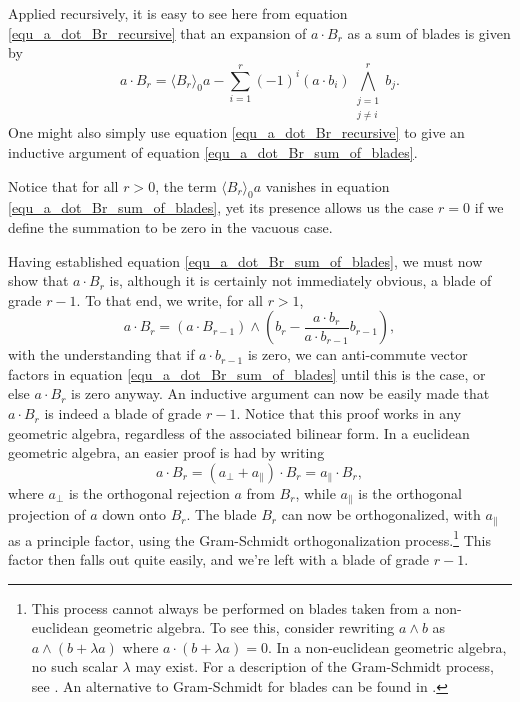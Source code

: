 \documentclass{birkjour}
\theoremstyle{definition}
\theoremstyle{remark}
\numberwithin{equation}{section}
\begin{document}
Applied recursively, it is easy to see here from equation \eqref{equ_a_dot_Br_recursive} that an expansion of
$a\cdot B_r$ as a sum of blades is given by
\begin{equation}\label{equ_a_dot_Br_sum_of_blades}
a\cdot B_r = \langle B_r\rangle_0a - \sum_{i=1}^r(-1)^i(a\cdot b_i)\bigwedge_{\substack{j=1\\j\neq i}}^r b_j.
\end{equation}
One might also simply use equation \eqref{equ_a_dot_Br_recursive} to give an inductive
argument of equation \eqref{equ_a_dot_Br_sum_of_blades}.

Notice that for all $r>0$, the term $\langle B_r\rangle_0a$ vanishes in equation \eqref{equ_a_dot_Br_sum_of_blades},
yet its presence allows us the case $r=0$ if we define the summation to be zero in the vacuous case.

Having established equation \eqref{equ_a_dot_Br_sum_of_blades}, we must now show that $a\cdot B_r$ is,
although it is certainly not immediately obvious, a blade of grade $r-1$.  To that end, we write, for all $r>1$,
\begin{equation*}
a\cdot B_r = (a\cdot B_{r-1})\wedge\left(b_r - \frac{a\cdot b_r}{a\cdot b_{r-1}}b_{r-1}\right),
\end{equation*}
with the understanding that if $a\cdot b_{r-1}$ is zero, we can anti-commute vector factors in equation \eqref{equ_a_dot_Br_sum_of_blades}
until this is the case, or else $a\cdot B_r$ is zero anyway.
An inductive argument can now be easily made that $a\cdot B_r$ is indeed a blade of grade $r-1$.
Notice that this proof works in any geometric algebra, regardless of the associated bilinear form.  In a euclidean geometric
algebra, an easier proof is had by writing
\begin{equation*}
a\cdot B_r = (a_{\perp} + a_{\parallel})\cdot B_r = a_{\parallel}\cdot B_r,
\end{equation*}
where $a_{\perp}$ is the orthogonal rejection $a$ from $B_r$, while $a_{\parallel}$ is the
orthogonal projection of $a$ down onto $B_r$.  The blade $B_r$ can now be orthogonalized,
with $a_{\parallel}$ as a principle factor, using the Gram-Schmidt orthogonalization process.\footnote{This process
cannot always be performed on blades taken from a non-euclidean geometric algebra.  To see this, consider rewriting
$a\wedge b$ as $a\wedge(b+\lambda a)$ where $a\cdot(b+\lambda a)=0$.  In a non-euclidean geometric algebra,
no such scalar $\lambda$ may exist.  For a description of the Gram-Schmidt process, see \cite{}.  An alternative
to Gram-Schmidt for blades can be found in \cite[p. 86]{DoranLasenby03}.}
This factor then falls out quite easily, and we're left with a blade of grade $r-1$.
\end{document}
